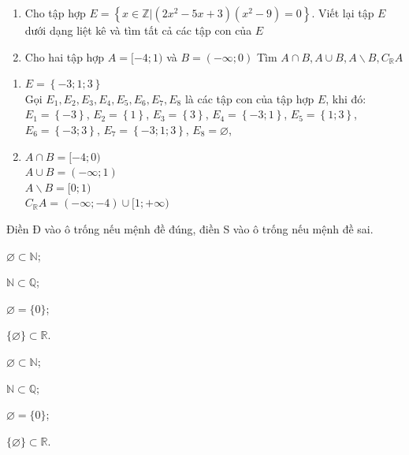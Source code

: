 \begin{bt}%
	\begin{enumerate}
		\item  Cho tập hợp $E=\left\{{x} \in \mathbb{Z} |\left(2 x ^2-5 x+3\right)\left(x^2-9\right)=0\right\}$. Viết lại tập $E$ dưới dạng liệt kê và tìm tất cả các tập con của $E$
		\item  Cho hai tập hợp $A=[-4; 1)$ và $B=(-\infty; 0)$ Tìm $A\cap B, A\cup B, A\backslash B, C_{\mathbb{R}} A$
	\end{enumerate}
	\loigiai
	{\begin{enumerate}
	\item $E=\left\{-3;1;3\right\}$\\ Gọi $E_1,E_2,E_3,E_4,E_5,E_6,E_7,E_8$ là các tập con của tập hợp $E$, khi đó:\\
	$E_1=\left\{-3\right\}$, $E_2=\left\{1\right\}$, $E_3=\left\{3\right\}$, $E_4=\left\{-3;1\right\}$, $E_5=\left\{1;3\right\}$, $E_6=\left\{-3;3\right\}$, $E_7=\left\{-3;1;3\right\}$, $E_8=\varnothing$, 
	\item $A\cap B=[-4;0)$\\
	$A\cup B=(-\infty;1)$\\
	$A\backslash B=[0;1)$\\
	$C_{\mathbb{R}} A=(-\infty;-4)\cup[1;+\infty)$
	\end{enumerate}}
\end{bt}

\begin{bt}%
	Điền Đ vào ô trống nếu mệnh đề đúng, điền S vào ô trống nếu mệnh đề sai.
	\begin{listEX}[2]
		\item \TF{\phantom{Đ}} $\varnothing\subset \mathbb{N}$;
		\item \TF{\phantom{Đ}} $\mathbb{N}\subset \mathbb{Q}$;
		\item \TF{\phantom{S}} $\varnothing = \{0\}$;
		\item \TF{\phantom{S}} $\{\varnothing \}\subset \mathbb{R}$.
	\end{listEX}
	\loigiai
	{
		\begin{listEX}[2]
			\item {} $\varnothing\subset \mathbb{N}$;
			\item {} $\mathbb{N}\subset \mathbb{Q}$;
			\item {} $\varnothing = \{0\}$;
			\item {} $\{\varnothing \}\subset \mathbb{R}$.
		\end{listEX}
	}	
\end{bt}

